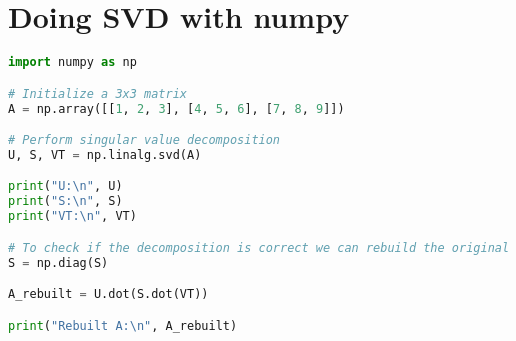 \section{Doing SVD with numpy}

\begin{lstlisting}[language=Python]
import numpy as np

# Initialize a 3x3 matrix
A = np.array([[1, 2, 3], [4, 5, 6], [7, 8, 9]])

# Perform singular value decomposition
U, S, VT = np.linalg.svd(A)

print("U:\n", U)
print("S:\n", S)
print("VT:\n", VT)

# To check if the decomposition is correct we can rebuild the original matrix:
S = np.diag(S)

A_rebuilt = U.dot(S.dot(VT))

print("Rebuilt A:\n", A_rebuilt)
\end{lstlisting}

